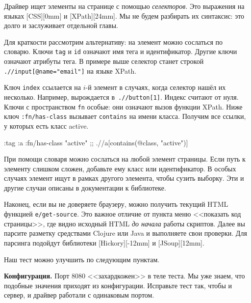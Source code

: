 
Драйвер ищет элементы на странице с помощью \emph{селекторов}. Это выражения на
языках [CSS][0mm] и
[XPath][24mm]. Мы не
будем разбирать их синтаксис: это долго и заслуживает отдельной главы.

Для краткости рассмотрим альтернативу: на элемент можно сослаться по
словарю. Ключи \verb|tag| и \verb|id| означают имя тега и идентификатор. Другие
ключи означают атрибуты тега. В примере выше селектор
 станет строкой
\verb|.//input[@name="email"]| на языке XPath.


Ключ \verb|index| ссылается на $i$-й элемент в случаях, когда селектор нашёл их
несколько. Например,  вырождается
в~\verb|.//button[1]|. Индекс считают от нуля. Ключи с пространством \verb|fn|
особые: они означают вызов функции XPath. Ниже ключ \verb|:fn/has-class|
вызывает \verb|contains| на имени класса. Получим все ссылки, у которых есть
класс active.

\begin{english}
  \begin{clojure}
{:tag :a :fn/has-class "active"}
;; .//a[contains(@class, "active")]
  \end{clojure}
\end{english}

При помощи словаря можно сослаться на любой элемент страницы. Если путь к
элементу слишком сложен, добавьте ему класс или идентификатор. В особых случаях
элемент ищут в рамках другого элемента, чтобы сузить выборку. Эти и другие
случаи описаны в документации к библиотеке.

Наконец, если вы не доверяете браузеру, можно получить текущий HTML функцией
\verb|e/get-source|. Это важное отличие от пункта меню <<показать код
страницы>>, где видно исходный HTML \emph{до начала} работы скриптов. Далее вы
парсите разметку средствами Clojure или Java и выполняете свои проверки. Для
парсинга подойдут библиотеки
[Hickory][-12mm] и
[JSoup][12mm].


Наш тест можно улучшить по следующим пунктам.

\textbf{Конфигурация.} Порт 8080 <<захардкожен>> в теле теста. Мы уже знаем, что
подобные значения приходят из конфигурации. Исправьте тест так, чтобы и сервер,
и драйвер работали с одинаковым портом.

